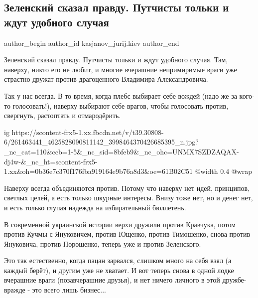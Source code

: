  
 
 
 
 
 
\subsection{Зеленский сказал правду. Путчисты тольки и ждут удобного случая}
\label{sec:26_11_2021.fb.kasjanov_jurij.kiev.1.zelenskii_putchisty}
 
\ifcmt
 author_begin
   author_id kasjanov_jurij.kiev
 author_end
\fi

Зеленский сказал правду. Путчисты тольки и ждут удобного случая. Там, наверху,
никто его не любит, и многие вчерашние непримиримые враги уже страстно дружат
против драгоценного Владимира Александровича.

Так у нас всегда. В то время, когда плебс выбирает себе вождей (надо же за
кого-то голосовать!), наверху выбирают себе врагов, чтобы голосовать против,
свергнуть, растоптать и отмародёрить.

\ifcmt
  ig https://scontent-frx5-1.xx.fbcdn.net/v/t39.30808-6/261463441_4625828090811142_3998464370426685395_n.jpg?_nc_cat=110&ccb=1-5&_nc_sid=8bfeb9&_nc_ohc=UNMX7SZDZAQAX-dj4w-&_nc_ht=scontent-frx5-1.xx&oh=0b36e7c370f176fba919164e9b76a8d3&oe=61B02C51
  @width 0.4
  @wrap 
\fi

Наверху всегда объединяются против. Потому что наверху нет идей, принципов,
светлых целей, а есть только шкурные интересы. Внизу тоже нет, но и денег нет,
и есть только глупая надежда на избирательный бюллетень. 

В современной украинской истории верхи дружили против Кравчука, потом против
Кучмы с Януковичем, против Ющенко, против Тимошенко, снова против Януковича,
против Порошенко, теперь уже и против Зеленского. 

Это так естественно, когда пацан зарвался, слишком много на себя взял (а каждый
берёт), и другим уже не хватает. И вот теперь снова в одной лодке вчерашние
враги (позавчерашние друзья), и нет ничего личного в этой дружбе-вражде - это
всего лишь бизнес...

